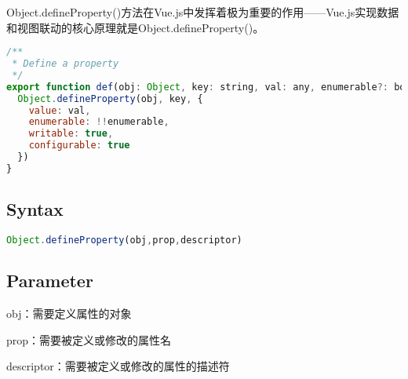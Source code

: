 Object.defineProperty()方法在Vue.js中发挥着极为重要的作用——Vue.js实现数据和视图联动的核心原理就是Object.defineProperty()。



\begin{lstlisting}[language=JavaScript]
/**
 * Define a property
 */
export function def(obj: Object, key: string, val: any, enumerable?: boolean) {
  Object.defineProperty(obj, key, {
    value: val,
    enumerable: !!enumerable,
    writable: true,
    configurable: true
  })
}
\end{lstlisting}


\subsection{Syntax}



\begin{lstlisting}[language=JavaScript]
Object.defineProperty(obj,prop,descriptor)
\end{lstlisting}

\subsection{Parameter}

\begin{compactitem}
\item obj：需要定义属性的对象
\item prop：需要被定义或修改的属性名
\item descriptor：需要被定义或修改的属性的描述符
\end{compactitem}






\begin{lstlisting}[language=JavaScript]

\end{lstlisting}




\begin{lstlisting}[language=JavaScript]

\end{lstlisting}






\begin{lstlisting}[language=JavaScript]

\end{lstlisting}






